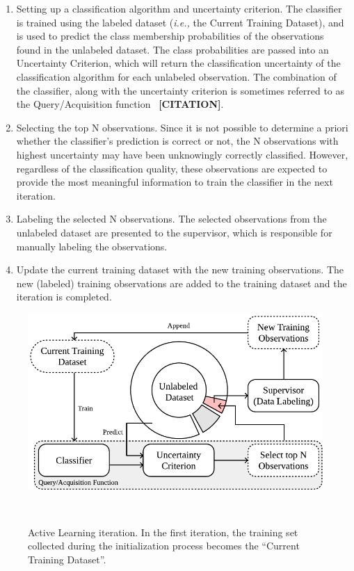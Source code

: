 \documentclass[parskip=full]{scrartcl}
\begin{document}
\begin{enumerate}

    \item Setting up a classification algorithm and uncertainty criterion. The
        classifier is trained using the labeled dataset (\textit{i.e.,} the
        Current Training Dataset), and is used to predict the class membership
        probabilities of the observations found in the unlabeled dataset. The
        class probabilities are passed into an Uncertainty Criterion, which
        will return the classification uncertainty of the classification
        algorithm for each unlabeled observation. The combination of the
        classifier, along with the uncertainty criterion is sometimes referred
        to as the Query/Acquisition function~\cite{Rosario2020} \textbf{[CITATION]}.

    \item Selecting the top N observations. Since it is not possible to
        determine a priori whether the classifier's prediction is correct or
        not, the N observations with highest uncertainty may have been
        unknowingly correctly classified. However, regardless of the
        classification quality, these observations are expected to provide the
        most meaningful information to train the classifier in the next
        iteration.

    \item Labeling the selected N observations. The selected observations from
        the unlabeled dataset are presented to the supervisor, which is
        responsible for manually labeling the observations.

    \item Update the current training dataset with the new training
        observations. The new (labeled) training observations are added to the
        training dataset and the iteration is completed.

\end{enumerate}

\begin{figure}[H]
	\centering
	\includegraphics[width=.65\linewidth]{../analysis/al_iteration}
    \caption{%
        Active Learning iteration. In the first iteration, the training set
        collected during the initialization process becomes the ``Current
        Training Dataset''.
    }~\label{fig:al_iteration}
\end{figure}
\end{document}
